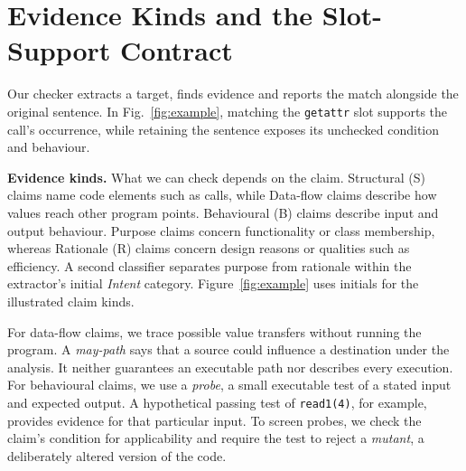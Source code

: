 \section{Evidence Kinds and the Slot-Support Contract}\label{sec:approach}
Our checker extracts a target, finds evidence and reports the match alongside the original sentence. In Fig.~\ref{fig:example}, matching the \texttt{getattr} slot supports the call's occurrence, while retaining the sentence exposes its unchecked condition and behaviour.

\noindent\textbf{Evidence kinds.} What we can check depends on the claim. Structural (S) claims name code elements such as calls, while Data-flow claims describe how values reach other program points. Behavioural (B) claims describe input and output behaviour. Purpose claims concern functionality or class membership, whereas Rationale (R) claims concern design reasons or qualities such as efficiency. A second classifier separates purpose from rationale within the extractor's initial \emph{Intent} category. Figure~\ref{fig:example} uses initials for the illustrated claim kinds.

For data-flow claims, we trace possible value transfers without running the program. A \emph{may-path} says that a source could influence a destination under the analysis. It neither guarantees an executable path nor describes every execution. For behavioural claims, we use a \emph{probe}, a small executable test of a stated input and expected output. A hypothetical passing test of \texttt{read1(4)}, for example, provides evidence for that particular input. To screen probes, we check the claim's condition for applicability and require the test to reject a \emph{mutant}, a deliberately altered version of the code.

